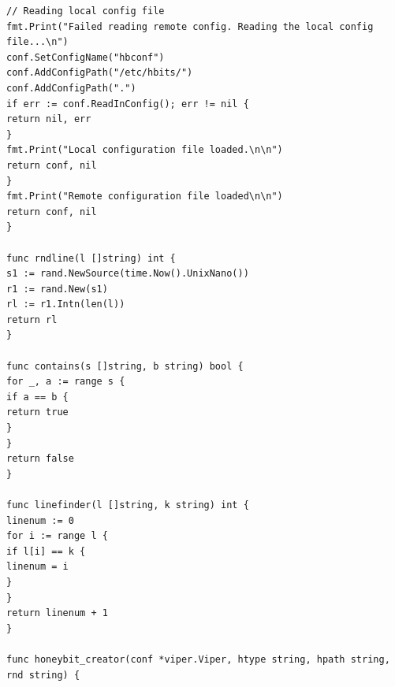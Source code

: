 \documentclass[grad,lot,lof,11pt,oneside,onehalfspace]{RUthesis}
\begin{document}
\begin{lstlisting}
// Reading local config file
fmt.Print("Failed reading remote config. Reading the local config file...\n")
conf.SetConfigName("hbconf")
conf.AddConfigPath("/etc/hbits/")
conf.AddConfigPath(".")
if err := conf.ReadInConfig(); err != nil {
return nil, err
}
fmt.Print("Local configuration file loaded.\n\n")
return conf, nil
}
fmt.Print("Remote configuration file loaded\n\n")
return conf, nil
}

func rndline(l []string) int {
s1 := rand.NewSource(time.Now().UnixNano())
r1 := rand.New(s1)
rl := r1.Intn(len(l))
return rl
}

func contains(s []string, b string) bool {
for _, a := range s {
if a == b {
return true
}
}
return false
}

func linefinder(l []string, k string) int {
linenum := 0
for i := range l {
if l[i] == k {
linenum = i
}
}
return linenum + 1
}

func honeybit_creator(conf *viper.Viper, htype string, hpath string, rnd string) {


\end{lstlisting}
\end{document}
